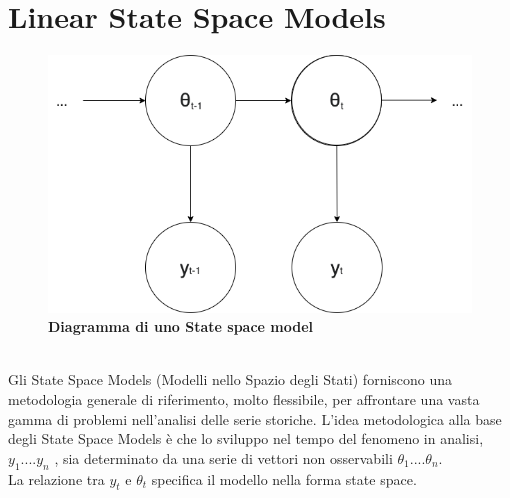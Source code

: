 \documentclass[]{article}
\begin{document}
\break
\section{Linear State Space Models}

\begin{figure}[!htp]
	\begin{center}
		\includegraphics[scale=0.3]{download.png}
		\caption{\textbf{Diagramma di uno State space model}}
	\end{center}
\end{figure}
\
\\
Gli State Space Models (Modelli nello Spazio degli Stati) forniscono una metodologia generale di riferimento, molto flessibile, per affrontare una vasta gamma di problemi nell’analisi delle serie storiche.
L’idea metodologica alla base degli State Space Models è che lo
sviluppo nel tempo del fenomeno in analisi, $y_1....y_n$ , sia determinato da una serie di vettori non osservabili $\theta_1....\theta_n$.
\\
La relazione tra $y_t$ e $\theta_t$ specifica il modello nella forma state space.
\end{document}
